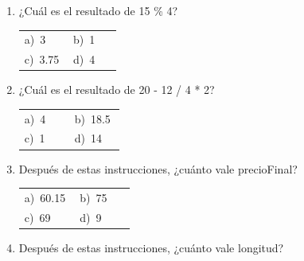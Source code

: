 \documentclass[11pt,a4paper]{article}
\begin{document}
\begin{enumerate}[label=\textbf{\arabic*.},leftmargin=*,itemsep=11pt,topsep=0pt]
\item \begin{minipage}[t]{\linewidth}
¿Cuál es el resultado de 15 \% 4?

\vspace{4pt}
\begin{tabular}{@{}p{0.47\linewidth}p{0.47\linewidth}@{}}
a)~3 & b)~1 \\
c)~3.75 & d)~4 \\
\end{tabular}
\end{minipage}

\item \begin{minipage}[t]{\linewidth}
¿Cuál es el resultado de 20 - 12 / 4 * 2?

\vspace{4pt}
\begin{tabular}{@{}p{0.47\linewidth}p{0.47\linewidth}@{}}
a)~4 & b)~18.5 \\
c)~1 & d)~14 \\
\end{tabular}
\end{minipage}

\item \begin{minipage}[t]{\linewidth}
Después de estas instrucciones, ¿cuánto vale precioFinal?

\vspace{2pt}{\small
\begin{verbatim}
CONSTANTE REAL IVA ← 0.15
REAL precioProducto ← 60.00
REAL precioFinal ← precioProducto + (precioProducto * IVA)
\end{verbatim}}


\vspace{4pt}
\begin{tabular}{@{}p{0.47\linewidth}p{0.47\linewidth}@{}}
a)~60.15 & b)~75 \\
c)~69 & d)~9 \\
\end{tabular}
\end{minipage}

\item \begin{minipage}[t]{\linewidth}
Después de estas instrucciones, ¿cuánto vale longitud?

\vspace{2pt}{\small
\begin{verbatim}
CONSTANTE REAL PI ← 3.1416
REAL r ← 5
REAL longitud ← 2 * PI * r
\end{verbatim}}



\end{minipage}
\end{enumerate}
\end{document}
